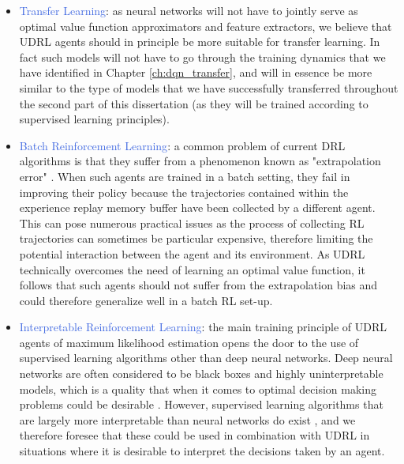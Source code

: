 \begin{itemize}
	\item \textcolor{RoyalBlue}{Transfer Learning}: as neural networks will not have to jointly serve as optimal value function approximators and feature extractors, we believe that UDRL agents should in principle be more suitable for transfer learning. In fact such models will not have to go through the training dynamics that we have identified in Chapter \ref{ch:dqn_transfer}, and will in essence be more similar to the type of models that we have successfully transferred throughout the second part of this dissertation (as they will be trained according to supervised learning principles).  
	\item \textcolor{RoyalBlue}{Batch Reinforcement Learning}: a common problem of current DRL algorithms is that they suffer from a phenomenon known as "extrapolation error" \cite{fujimoto2019benchmarking}. When such agents are trained in a batch setting, they fail in improving their policy because the trajectories contained within the experience replay memory buffer have been collected by a different agent. This can pose numerous practical issues as the process of collecting RL trajectories can sometimes be particular expensive, therefore limiting the potential interaction between the agent and its environment. As UDRL technically overcomes the need of learning an optimal value function, it follows that such agents should not suffer from the extrapolation bias and could therefore generalize well in a batch RL set-up.   
	\item \textcolor{RoyalBlue}{Interpretable Reinforcement Learning}: the main training principle of UDRL agents of maximum likelihood estimation opens the door to the use of supervised learning algorithms other than deep neural networks. Deep neural networks are often considered to be black boxes and highly uninterpretable models, which is a quality that when it comes to optimal decision making problems could be desirable \cite{mott2019towards}. However, supervised learning algorithms that are largely more interpretable than neural networks do exist \cite{breiman2001random}, and we therefore foresee that these could be used in combination with UDRL in situations where it is desirable to interpret the decisions taken by an agent.
\end{itemize}
  
